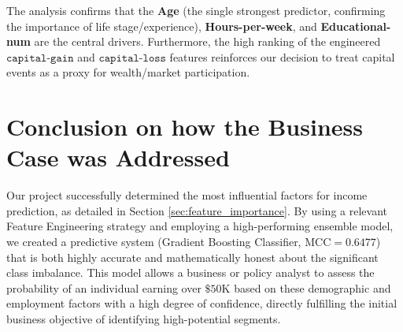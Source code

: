 The analysis confirms that the \textbf{Age} (the single strongest predictor, confirming the importance of life stage/experience), \textbf{Hours-per-week}, and \textbf{Educational-num} are the central drivers. Furthermore, the high ranking of the engineered $\texttt{capital-gain}$ and $\texttt{capital-loss}$ features reinforces our decision to treat capital events as a proxy for wealth/market participation.

\vspace{1 \baselineskip}




\section{Conclusion on how the Business Case was Addressed}
\label{sec:business_case}

Our project successfully determined the most influential factors for income prediction, as detailed in Section \ref{sec:feature_importance}. By using a relevant Feature Engineering strategy and employing a high-performing ensemble model, we created a predictive system (Gradient Boosting Classifier, $\text{MCC}=0.6477$) that is both highly accurate and mathematically honest about the significant class imbalance. This model allows a business or policy analyst to assess the probability of an individual earning over $\$50\text{K}$ based on these demographic and employment factors with a high degree of confidence, directly fulfilling the initial business objective of identifying high-potential segments.


\vspace{2 \baselineskip}